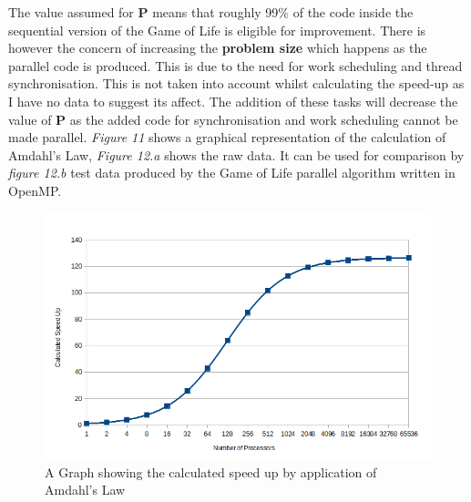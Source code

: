 \documentclass[11pt]{article} %
\begin{document}
The value assumed for {\bf P} means that roughly 99\% of the code inside the sequential version of the Game of Life is eligible for improvement. There is however the concern of increasing the {\bf problem size} which happens as the parallel code is produced. This is due to the need for work scheduling and thread synchronisation. This is not taken into account whilst calculating the speed-up as I have no data to suggest its affect. The addition of these tasks will decrease the value of {\bf P} as the added code for synchronisation and work scheduling cannot be made parallel. {\it Figure 11} shows a graphical representation of the calculation of Amdahl's Law, {\it Figure 12.a} shows the raw data. It can be used for comparison by {\it figure 12.b} test data produced by the Game of Life parallel algorithm written in OpenMP.
\begin{figure}[h]
\centering
\includegraphics[scale=0.5]{Amdahl.png}
\caption{A Graph showing the calculated speed up by application of Amdahl's Law}
\label{fig: AmdahlGraph}
\end{figure}
\end{document}
